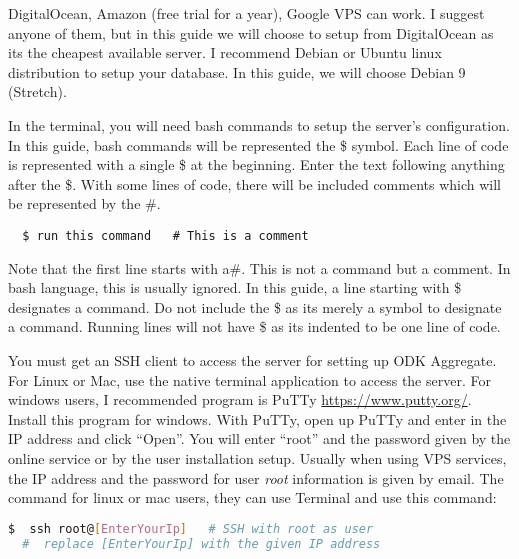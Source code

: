 DigitalOcean, Amazon (free trial for a year), Google VPS can work. I suggest anyone of them, but in this guide we will choose to setup from DigitalOcean as its the cheapest available server. I recommend Debian or Ubuntu linux distribution to setup your database. In this guide, we will choose Debian 9 (Stretch).




\noindent
In the terminal, you will need bash commands to setup the server's configuration. In this guide, bash commands will be represented the \$ symbol. Each line of code is represented with a single \$ at the beginning. Enter the text following anything after the \$. With some lines of code, there will be included comments which will be represented by the \#.

\begin{lstlisting}
  $ run this command   # This is a comment
\end{lstlisting}





\noindent
Note that the first line starts with a\#. This is not a command but a comment. In bash language, this is usually ignored. In this guide, a line starting with \$ designates a command. Do not include the \$ as its merely a symbol to designate a command. Running lines will not have \$ as its indented to be one line of code.






\noindent
You must get an SSH client to access the server for setting up ODK Aggregate. For Linux or Mac, use the native terminal application to access the server. For windows users, I recommended program is PuTTy \url{https://www.putty.org/}. Install this program for windows. With PuTTy, open up PuTTy and enter in the IP address and click ``Open''. You will enter ``root'' and the password given by the online service or by the user installation setup.  Usually when using VPS services, the IP address and the password for user \emph{root} information is given by email.
\noindent
The command for linux or mac users, they can use Terminal and use this command:
\begin{lstlisting}[language=bash]
  $  ssh root@[EnterYourIp]   # SSH with root as user
  #  replace [EnterYourIp] with the given IP address
\end{lstlisting}



